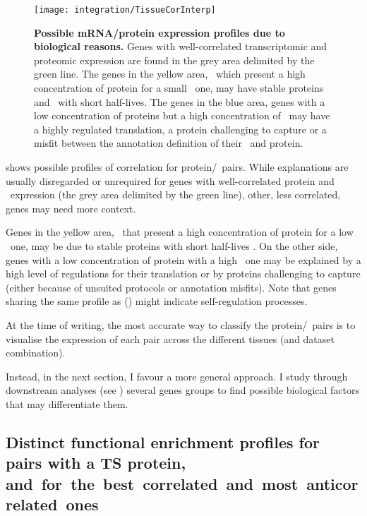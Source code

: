 \begin{figure}[!htb]
    \texttt{[image: integration/TissueCorInterp]}\centering
    \vspace{-3mm}
    \caption[Possible mRNA/protein expression profiles
    due to biological reasons.]{\label{fig:CorImprovable}%
    \textbf{Possible mRNA/protein expression profiles due to biological reasons.}
    Genes with well-correlated transcriptomic and proteomic expression
    are found in the grey area delimited by the green line.
    The genes in the yellow area,
    \ie\ which present a high concentration of protein for a small \mRNA\ one,
    may have stable proteins and \mRNAs\ with short half-lives.
    The genes in the blue area,
    genes with a low concentration of proteins but a high concentration of \mRNAs\
    may have a highly regulated translation,
    a protein challenging to capture
    or a misfit between the annotation definition of their \mRNA\ and protein.
    }
\end{figure}


 shows possible profiles of correlation for
protein/\mRNA\ pairs.
While explanations are usually disregarded or unrequired for genes
with well-correlated protein and \mRNA\ expression
(the grey area delimited by the green line),
other, less correlated, genes may need more context.

Genes in the yellow area,
\ie\ that present a high concentration of protein for a low \mRNA\ one,
may be due to stable proteins with short half-lives \mRNAs{}.
On the other side,
genes with a low concentration of protein with a high \mRNA\ one
may be explained by a high level of regulations for their translation
or by proteins challenging to capture
(either because of unsuited protocols or annotation misfits).
Note that genes sharing the same profile as  ()
might indicate self-regulation processes.

At the time of writing,
the most accurate way to classify the protein/\mRNA\ pairs
is to visualise the expression of each pair across the different tissues
(and dataset combination).

Instead, in the next section, I favour a more general approach.
I study through downstream analyses (see )
several genes groups
to find possible biological factors that may differentiate them.

\subsection{Distinct functional enrichment profiles
for pairs with a TS protein,
and~for~the~best~correlated~and~most~anticorrelated~ones}

